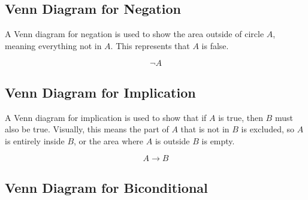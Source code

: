 \documentclass[12pt,a4paper,openany]{article}
\begin{document}
\subsection{Venn Diagram for Negation}\label{ven-diagram-for-negation}

A Venn diagram for negation is used to show the area outside of circle \(A\), meaning everything not in \(A\). This represents that \(A\) is false.

\[
\neg A
\]

\begin{center}
\end{center}

\subsection{Venn Diagram for Implication}\label{venn-diagram-for-implication}

A Venn diagram for implication is used to show that if \(A\) is true, then \(B\) must also be true. Visually, this means the part of \(A\) that is not in \(B\) is excluded, so \(A\) is entirely inside \(B\), or the area where \(A\) is outside \(B\) is empty.

\[
A \to B
\]

\begin{center}
\end{center}

\subsection{Venn Diagram for Biconditional}\label{venn-diagram-for-implication}
\end{document}
